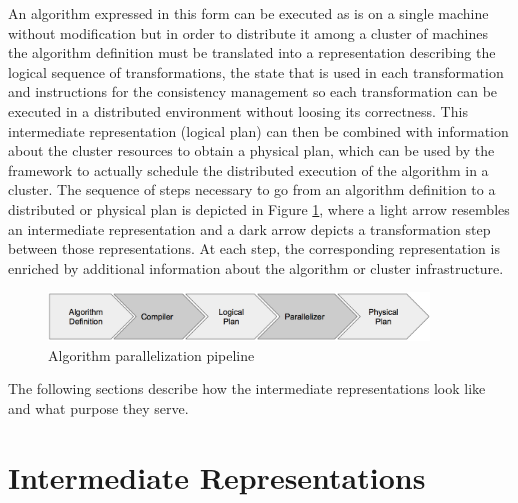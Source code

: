 An algorithm expressed in this form can be executed as is on a single machine without modification but in order to distribute it among a cluster of machines the algorithm definition must be translated into a representation describing the logical sequence of transformations, the state that is used in each transformation and instructions for the consistency management so each transformation can be executed in a distributed environment without loosing its correctness.
This intermediate representation (logical plan) can then be combined with information about the cluster resources to obtain a physical plan, which can be used by the framework to actually schedule the distributed execution of the algorithm in a cluster.
The sequence of steps necessary to go from an algorithm definition to a distributed or physical plan is depicted in Figure \ref{fig:parallel_pipeline}, where a light arrow resembles an intermediate representation and a dark arrow depicts a transformation step between those representations.
At each step, the corresponding representation is enriched by additional information about the algorithm or cluster infrastructure.
\begin{figure}[ht]
\centering
\includegraphics[width=0.9\textwidth]{img/algo_parallel_pipeline.png}
\caption{Algorithm parallelization pipeline}
\label{fig:parallel_pipeline}
\end{figure}
The following sections describe how the intermediate representations look like and what purpose they serve.

\section{Intermediate Representations}

